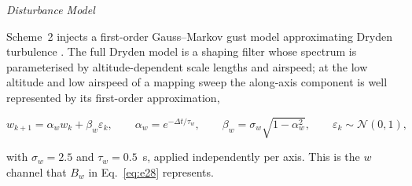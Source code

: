 \documentclass[10pt,letterpaper]{article}
\newcommand{\headingthree}[1]{%
    \par\vspace{6pt}%
    {\centering\fontsize{10}{12}\selectfont\itshape #1\par}%
    \vspace{2pt}\noindent\ignorespaces}
\newcommand{\citt}[2]{\cite{#1,#2}}
\begin{document}
\headingthree{Disturbance Model}

Scheme~2 injects a first-order Gauss--Markov gust model approximating Dryden turbulence
\citt{milhdbk1797}{beardSmallUnmannedAircraft2012}. The full Dryden model is a shaping
filter whose spectrum is parameterised by altitude-dependent scale lengths and airspeed;
at the low altitude and low airspeed of a mapping sweep the along-axis component is well
represented by its first-order approximation,

\begin{equation}
    \label{eq:e36}
    w_{k+1}=\alpha_w w_k+\beta_w\varepsilon_k,
    \qquad
    \alpha_w=e^{-\Delta t/\tau_w},
    \qquad
    \beta_w=\sigma_w\sqrt{1-\alpha_w^2},
    \qquad \varepsilon_k\sim\mathcal{N}(0,1),
\end{equation}

with $\sigma_w=2.5$ and $\tau_w=0.5$~s, applied independently per axis. This is the $w$
channel that $B_w$ in Eq.~\eqref{eq:e28} represents.
\end{document}
